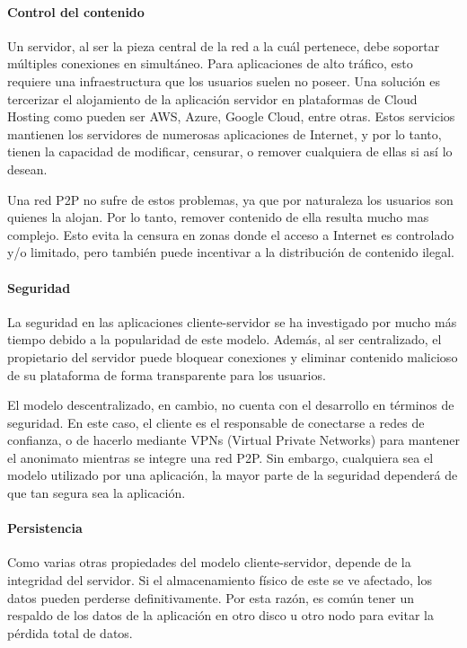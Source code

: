 \paragraph{Control del contenido}
Un servidor, al ser la pieza central de la red a la cuál pertenece, debe soportar múltiples conexiones en simultáneo. Para aplicaciones de alto tráfico, esto requiere una infraestructura que los usuarios suelen no poseer. Una solución es tercerizar el alojamiento de la aplicación servidor en plataformas de Cloud Hosting como pueden ser AWS, Azure, Google Cloud, entre otras. Estos servicios mantienen los servidores de numerosas aplicaciones de Internet, y por lo tanto, tienen la capacidad de modificar, censurar, o remover cualquiera de ellas si así lo desean.

Una red P2P no sufre de estos problemas, ya que por naturaleza los usuarios son quienes la alojan. Por lo tanto, remover contenido de ella resulta mucho mas complejo. Esto evita la censura en zonas donde el acceso a Internet es controlado y/o limitado, pero también puede incentivar a la distribución de contenido ilegal.

\paragraph{Seguridad}
La seguridad en las aplicaciones cliente-servidor se ha investigado por mucho más tiempo debido a la popularidad de este modelo. Además, al ser centralizado, el propietario del servidor puede bloquear conexiones y eliminar contenido malicioso de su plataforma de forma transparente para los usuarios.

El modelo descentralizado, en cambio, no cuenta con el desarrollo en términos de seguridad. En este caso, el cliente es el responsable de conectarse a redes de confianza, o de hacerlo mediante VPNs (Virtual Private Networks) para mantener el anonimato mientras se integre una red P2P. Sin embargo, cualquiera sea el modelo utilizado por una aplicación, la mayor parte de la seguridad dependerá de que tan segura sea la aplicación.

\paragraph{Persistencia}
Como varias otras propiedades del modelo cliente-servidor, depende de la integridad del servidor. Si el almacenamiento físico de este se ve afectado, los datos pueden perderse definitivamente. Por esta razón, es común tener un respaldo de los datos de la aplicación en otro disco u otro nodo para evitar la pérdida total de datos.

